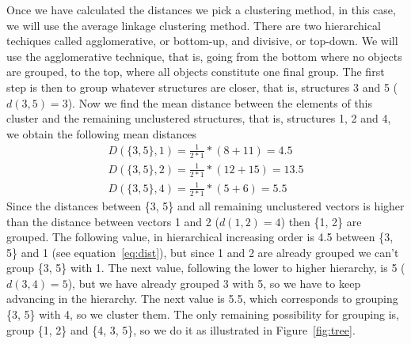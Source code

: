 Once we have calculated the  distances we pick a clustering method, in
this case,  we will use  the average linkage clustering  method. There
are two hierarchical techiques called agglomerative, or bottom-up, and
divisive, or  top-down. We will use the  agglomerative technique, that
is, going  from the bottom where  no objects are grouped,  to the top,
where all objects  constitute one final group. The  first step is then
to group whatever  structures are closer, that is,  structures 3 and 5
($d(3, 5)=3$). Now  we find the mean distance  between the elements of
this  cluster  and  the  remaining unclustered  structures,  that  is,
structures 1, 2 and 4, we obtain the following mean distances
\begin{gather}
D(\{3,5\}, 1)=\frac{1}{2*1}*(8+11) = 4.5 \label{eq:dist}\\
D(\{3,5\}, 2)=\frac{1}{2*1}*(12+15) = 13.5\\
D(\{3,5\}, 4)=\frac{1}{2*1}*(5+6) = 5.5
\end{gather}
Since  the distances between  \{3, 5\}  and all  remaining unclustered
vectors is  higher than  the distance between  vectors 1 and  2 ($d(1,
2)=4$) then \{1, 2\} are grouped. The following value, in hierarchical
increasing   order   is   4.5    between   \{3,   5\}   and   1   (see
equation~\ref{eq:dist}),  but since  1 and  2 are  already  grouped we
can't group  \{3, 5\} with 1.  The next value, following  the lower to
higher hierarchy,  is 5 ($d(3, 4)=5$),  but we have  already grouped 3
with 5, so we have to  keep advancing in the hierarchy. The next value
is 5.5, which  corresponds to grouping \{3, 5\} with  4, so we cluster
them. The only  remaining possibility for grouping is,  group \{1, 2\}
and \{4, 3, 5\}, so we do it as illustrated in Figure~\ref{fig:tree}.
